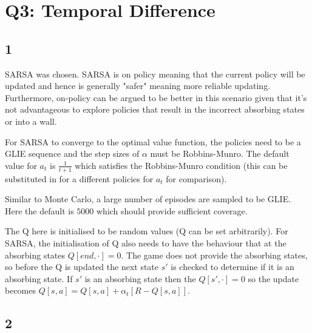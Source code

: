 \section*{Q3: Temporal Difference}
\subsection*{1}

SARSA was chosen. SARSA is on policy meaning that the current
policy will be updated and hence is generally "safer" meaning 
more reliable updating. Furthermore, on-policy can be argued to 
be better in this scenario given that it's not advantageous to
explore policies that result in the incorrect absorbing states
or into a wall. 

For SARSA to converge to the optimal value function, the policies
need to be a GLIE sequence and the step sizes of $\alpha$ must be 
Robbins-Munro. The default value for $a_t$ is $\frac{1}{t+1}$ which 
satisfies the Robbins-Munro condition (this can be substituted in 
for a different policies for $a_t$ for comparison).

Similar to Monte Carlo, a large number of episodes are sampled 
to be GLIE. Here the default is $5000$ which should provide 
sufficient coverage. 

The Q here is initialised to be random values (Q can be 
set arbitrarily). 
For SARSA, the initialisation of Q also needs
to have the behaviour that at the absorbing states 
$Q[end, \cdot] = 0$. The game does not
provide the absorbing states, so before the Q is updated 
the next state $s'$ is checked to determine if it is an absorbing
state. If $s'$ is an absorbing state then the $Q[s', \cdot] = 0$
so the update becomes $Q[s, a] = Q[s, a] + \alpha_t [R - Q[s,a]]$.


\subsection*{2}

